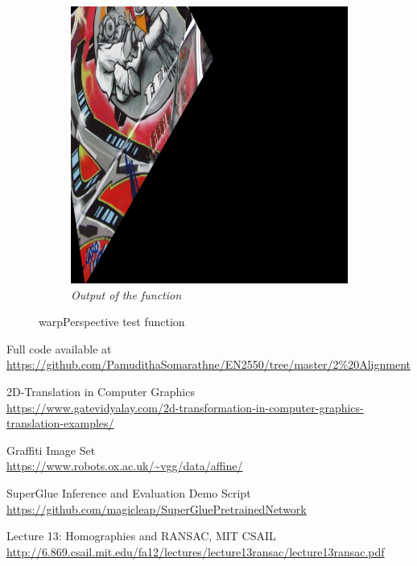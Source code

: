 \documentclass[11pt, a4paper]{article}
\begin{document}
\begin{figure}[H]
\begin{subfigure}[b]{0.32\textwidth}
		\centering
		\includegraphics[width=\textwidth]{./images/Bim1Warp.jpg}
		\caption{{\small \textit{Output of the function}}}
		\label{fig:h3}
	\end{subfigure}
	\hfill
	\caption{warpPerspective test function}
\end{figure}

Full code available at \url{https://github.com/PamudithaSomarathne/EN2550/tree/master/2\%20Alignment}

\begin{thebibliography}{AA}
2D-Translation in Computer Graphics\\
\url{https://www.gatevidyalay.com/2d-transformation-in-computer-graphics-translation-examples/}

Graffiti Image Set\\
\url{https://www.robots.ox.ac.uk/~vgg/data/affine/}

SuperGlue Inference and Evaluation Demo Script\\
\url{https://github.com/magicleap/SuperGluePretrainedNetwork}

Lecture 13: Homographies and RANSAC, MIT CSAIL\\
\url{http://6.869.csail.mit.edu/fa12/lectures/lecture13ransac/lecture13ransac.pdf}

\nocite{T, VGG, SuperGlue, MITHomo}
\end{thebibliography}
\end{document}
